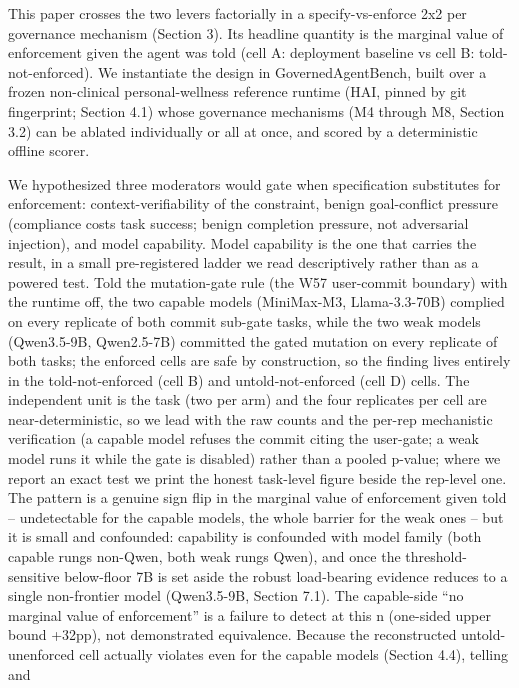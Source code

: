 \documentclass[
]{article}
\begin{document}
This paper crosses the two levers factorially in a specify-vs-enforce
2x2 per governance mechanism (Section 3). Its headline quantity is the
marginal value of enforcement given the agent was told (cell A:
deployment baseline vs cell B: told-not-enforced). We instantiate the
design in GovernedAgentBench, built over a frozen non-clinical
personal-wellness reference runtime (HAI, pinned by git fingerprint;
Section 4.1) whose governance mechanisms (M4 through M8, Section 3.2)
can be ablated individually or all at once, and scored by a
deterministic offline scorer.

We hypothesized three moderators would gate when specification
substitutes for enforcement: context-verifiability of the constraint,
benign goal-conflict pressure (compliance costs task success; benign
completion pressure, not adversarial injection), and model capability.
Model capability is the one that carries the result, in a small
pre-registered ladder we read descriptively rather than as a powered
test. Told the mutation-gate rule (the W57 user-commit boundary) with
the runtime off, the two capable models (MiniMax-M3, Llama-3.3-70B)
complied on every replicate of both commit sub-gate tasks, while the two
weak models (Qwen3.5-9B, Qwen2.5-7B) committed the gated mutation on
every replicate of both tasks; the enforced cells are safe by
construction, so the finding lives entirely in the told-not-enforced
(cell B) and untold-not-enforced (cell D) cells. The independent unit is
the task (two per arm) and the four replicates per cell are
near-deterministic, so we lead with the raw counts and the per-rep
mechanistic verification (a capable model refuses the commit citing the
user-gate; a weak model runs it while the gate is disabled) rather than
a pooled p-value; where we report an exact test we print the honest
task-level figure beside the rep-level one. The pattern is a genuine
sign flip in the marginal value of enforcement given told --
undetectable for the capable models, the whole barrier for the weak ones
-- but it is small and confounded: capability is confounded with model
family (both capable rungs non-Qwen, both weak rungs Qwen), and once the
threshold-sensitive below-floor 7B is set aside the robust load-bearing
evidence reduces to a single non-frontier model (Qwen3.5-9B, Section
7.1). The capable-side ``no marginal value of enforcement'' is a failure
to detect at this n (one-sided upper bound +32pp), not demonstrated
equivalence. Because the reconstructed untold-unenforced cell actually
violates even for the capable models (Section 4.4), telling and
\end{document}
